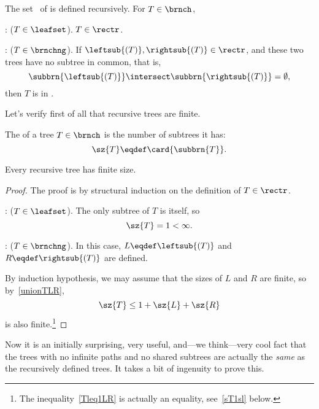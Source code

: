 \begin{definition}
\begin{definition}\label{def:rectree}
The set \rectr\ of  is defined recursively.  For
$T \in \brnch$,

: ($T \in \leafset$).  $T \in \rectr$.

: ($T \in \brnchng$).
If $\leftsub{(T)}, \rightsub{(T)} \in \rectr$, and these two trees
have no subtree in common, that is,
\[
\subbrn{\leftsub{(T)}} \intersect \subbrn{\rightsub{(T)}} = \emptyset,
\]
then $T$ is in \rectr.
\end{definition}

Let's verify first of all that recursive trees are finite.
\begin{definition}
The   of a tree $T \in \brnch$ is the
number of subtrees it has:
\begin{equation}\label{treesizedef}
\sz{T} \eqdef \card{\subbrn{T}}.
\end{equation}
\end{definition}

\begin{corollary}\label{cor:finitetree}
Every recursive tree has finite size.

\begin{proof}
The proof is by structural induction on the definition of $T \in
\rectr$.

: ($T \in \leafset$).  The only subtree of $T$
is itself, so
\[
\sz{T} = 1 < \infty.
\]

: ($T \in \brnchng$).  In this case,
$L \eqdef \leftsub{(T)}$ and $R \eqdef \rightsub{(T)}$ are defined.

By induction hypothesis, we may assume that the sizes of $L$ and $R$
are finite, so by~\eqref{unionTLR},
\begin{equation}\label{Tleq1LR}
\sz{T} \leq 1 + \sz{L} + \sz{R}
\end{equation}
is also finite.\footnote{The inequality~\eqref{Tleq1LR} is actually an
  equality, see~\eqref{sT1sl} below.}
\end{proof}
\end{corollary}

Now it is an initially surprising, very useful, and---we think---very
cool fact that the trees with no infinite paths and no shared subtrees
are actually the \emph{same} as the recursively defined trees.  It
takes a bit of ingenuity to prove this.


\end{definition}
